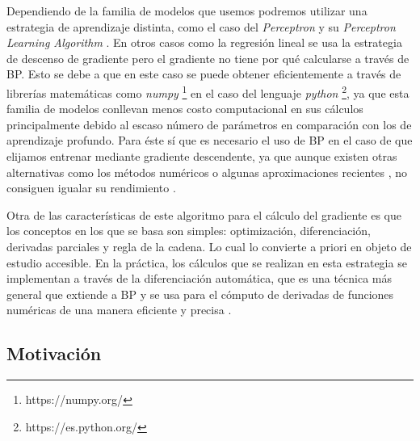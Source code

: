Dependiendo de la familia de modelos que usemos podremos utilizar una estrategia de aprendizaje distinta, como el caso del \textit{Perceptron} y su \textit{Perceptron Learning Algorithm} \cite{patternrecog}. En otros casos como la regresión lineal se usa la estrategia de descenso de gradiente pero el gradiente no tiene por qué calcularse a través de BP. Esto se debe a que en este caso se puede obtener eficientemente a través de librerías matemáticas como \textit{numpy} \footnote{https://numpy.org/} en el caso del lenguaje \textit{python} \footnote{https://es.python.org/}, ya que esta familia de modelos conllevan menos costo computacional en sus cálculos principalmente debido al escaso número de parámetros en comparación con los de aprendizaje profundo. Para éste sí que es necesario el uso de BP en el caso de que elijamos entrenar mediante gradiente descendente, ya que aunque existen otras alternativas como los métodos numéricos o algunas aproximaciones recientes , no consiguen igualar su rendimiento \cite{EffBackProp, GoodFellowBook, alternativabacknumerical, alternativabackprop1}.


Otra de las características de este algoritmo para el cálculo del gradiente es que los conceptos en los que se basa son simples: optimización, diferenciación, derivadas parciales y regla de la cadena. Lo cual lo convierte a priori en objeto de estudio accesible. En la práctica, los cálculos que se realizan en esta estrategia se implementan a través de la diferenciación automática, que es una técnica más general que extiende a BP y se usa para el cómputo de derivadas de funciones numéricas de una manera eficiente y precisa \cite{AutomaticDiff}.%



\subsection{Motivación}

